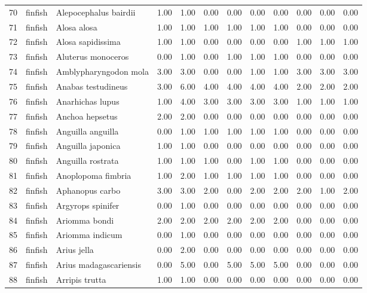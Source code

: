 \begin{table}[ht]
\begin{tabular}{rllrrrrrrrrr}
  70 & finfish & Alepocephalus bairdii & 1.00 & 1.00 & 0.00 & 0.00 & 0.00 & 0.00 & 0.00 & 0.00 & 0.00 \\ 
  71 & finfish & Alosa alosa & 1.00 & 1.00 & 1.00 & 1.00 & 1.00 & 1.00 & 0.00 & 0.00 & 0.00 \\ 
  72 & finfish & Alosa sapidissima & 1.00 & 1.00 & 0.00 & 0.00 & 0.00 & 0.00 & 1.00 & 1.00 & 1.00 \\ 
  73 & finfish & Aluterus monoceros & 0.00 & 1.00 & 0.00 & 1.00 & 1.00 & 1.00 & 0.00 & 0.00 & 0.00 \\ 
  74 & finfish & Amblypharyngodon mola & 3.00 & 3.00 & 0.00 & 0.00 & 1.00 & 1.00 & 3.00 & 3.00 & 3.00 \\ 
  75 & finfish & Anabas testudineus & 3.00 & 6.00 & 4.00 & 4.00 & 4.00 & 4.00 & 2.00 & 2.00 & 2.00 \\ 
  76 & finfish & Anarhichas lupus & 1.00 & 4.00 & 3.00 & 3.00 & 3.00 & 3.00 & 1.00 & 1.00 & 1.00 \\ 
  77 & finfish & Anchoa hepsetus & 2.00 & 2.00 & 0.00 & 0.00 & 0.00 & 0.00 & 0.00 & 0.00 & 0.00 \\ 
  78 & finfish & Anguilla anguilla & 0.00 & 1.00 & 1.00 & 1.00 & 1.00 & 1.00 & 0.00 & 0.00 & 0.00 \\ 
  79 & finfish & Anguilla japonica & 1.00 & 1.00 & 0.00 & 0.00 & 0.00 & 0.00 & 0.00 & 0.00 & 0.00 \\ 
  80 & finfish & Anguilla rostrata & 1.00 & 1.00 & 1.00 & 0.00 & 1.00 & 1.00 & 0.00 & 0.00 & 0.00 \\ 
  81 & finfish & Anoplopoma fimbria & 1.00 & 2.00 & 1.00 & 1.00 & 1.00 & 1.00 & 0.00 & 0.00 & 0.00 \\ 
  82 & finfish & Aphanopus carbo & 3.00 & 3.00 & 2.00 & 0.00 & 2.00 & 2.00 & 2.00 & 1.00 & 2.00 \\ 
  83 & finfish & Argyrops spinifer & 0.00 & 1.00 & 0.00 & 0.00 & 0.00 & 0.00 & 0.00 & 0.00 & 0.00 \\ 
  84 & finfish & Ariomma bondi & 2.00 & 2.00 & 2.00 & 2.00 & 2.00 & 2.00 & 0.00 & 0.00 & 0.00 \\ 
  85 & finfish & Ariomma indicum & 0.00 & 1.00 & 0.00 & 0.00 & 0.00 & 0.00 & 0.00 & 0.00 & 0.00 \\ 
  86 & finfish & Arius jella & 0.00 & 2.00 & 0.00 & 0.00 & 0.00 & 0.00 & 0.00 & 0.00 & 0.00 \\ 
  87 & finfish & Arius madagascariensis & 0.00 & 5.00 & 0.00 & 5.00 & 5.00 & 5.00 & 0.00 & 0.00 & 0.00 \\ 
  88 & finfish & Arripis trutta & 1.00 & 1.00 & 0.00 & 0.00 & 0.00 & 0.00 & 0.00 & 0.00 & 0.00 \\ 

\end{tabular}
\end{table}
